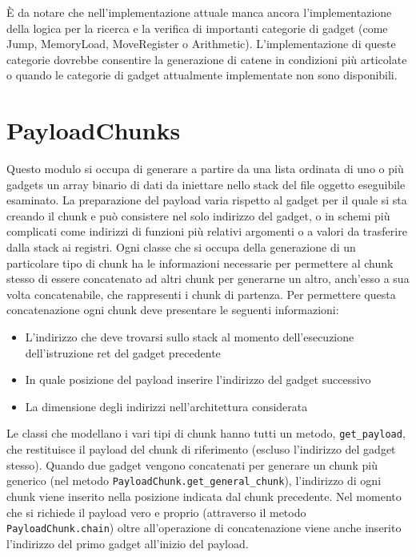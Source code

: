 È da notare che nell'implementazione attuale manca ancora
l'implementazione della logica per la ricerca e la verifica di
importanti categorie di gadget (come Jump, MemoryLoad, MoveRegister o
Arithmetic). L'implementazione di queste categorie dovrebbe consentire
la generazione di catene in condizioni più articolate o quando le
categorie di gadget attualmente implementate non sono disponibili.

\section{PayloadChunks}

Questo modulo si occupa di generare a partire da una lista ordinata di
uno o più gadgets un array binario di dati da iniettare nello stack
del file oggetto eseguibile esaminato. La preparazione del payload
varia rispetto al gadget per il quale si sta creando il chunk e può
consistere nel solo indirizzo del gadget, o in schemi più complicati
come indirizzi di funzioni più relativi argomenti o a valori da
trasferire dalla stack ai registri. Ogni classe che si occupa della
generazione di un particolare tipo di chunk ha le informazioni
necessarie per permettere al chunk stesso di essere concatenato ad
altri chunk per generarne un altro, anch'esso a sua volta
concatenabile, che rappresenti i chunk di partenza. Per permettere
questa concatenazione ogni chunk deve presentare le seguenti
informazioni:


\begin{itemize}

\item L'indirizzo che deve trovarsi sullo stack al momento
  dell'esecuzione dell'istruzione ret del gadget precedente 

\item In quale posizione del payload inserire l'indirizzo del gadget
  successivo

\item La dimensione degli indirizzi nell'architettura considerata

\end{itemize}


Le classi che modellano i vari tipi di chunk hanno tutti un metodo,
\lstinline{get_payload}, che restituisce il payload del chunk di
riferimento (escluso l'indirizzo del gadget stesso). Quando due gadget
vengono concatenati per generare un chunk più generico (nel metodo
\lstinline{PayloadChunk.get_general_chunk}), l'indirizzo di ogni chunk
viene inserito nella posizione indicata dal chunk precedente. Nel
momento che si richiede il payload vero e proprio (attraverso il
metodo \lstinline{PayloadChunk.chain}) oltre all'operazione di
concatenazione viene anche inserito l'indirizzo del primo gadget
all'inizio del payload.

